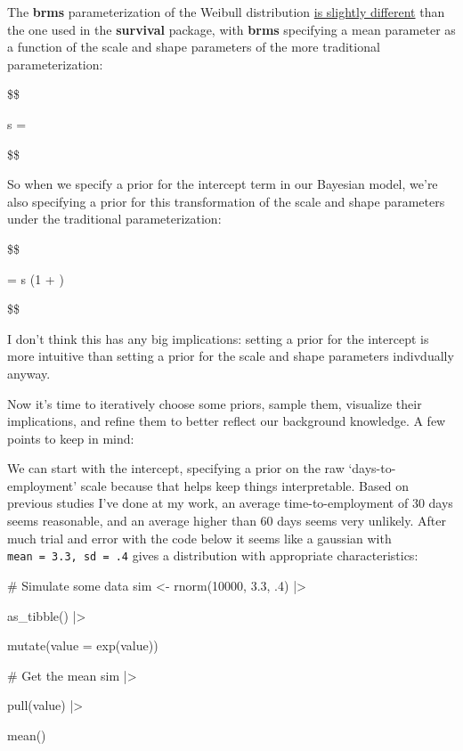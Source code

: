 \documentclass[
  letterpaper,
  DIV=11,
  numbers=noendperiod]{scrreprt}
\newenvironment{Shaded}{\begin{snugshade}}{\end{snugshade}}
\newcommand{\AttributeTok}[1]{\textcolor[rgb]{0.40,0.45,0.13}{#1}}
\newcommand{\CommentTok}[1]{\textcolor[rgb]{0.37,0.37,0.37}{#1}}
\newcommand{\DecValTok}[1]{\textcolor[rgb]{0.68,0.00,0.00}{#1}}
\newcommand{\FloatTok}[1]{\textcolor[rgb]{0.68,0.00,0.00}{#1}}
\newcommand{\FunctionTok}[1]{\textcolor[rgb]{0.28,0.35,0.67}{#1}}
\newcommand{\NormalTok}[1]{\textcolor[rgb]{0.00,0.23,0.31}{#1}}
\newcommand{\OtherTok}[1]{\textcolor[rgb]{0.00,0.23,0.31}{#1}}
\newcommand{\SpecialCharTok}[1]{\textcolor[rgb]{0.37,0.37,0.37}{#1}}
\begin{document}
The \textbf{brms} parameterization of the Weibull distribution
\href{https://cran.r-project.org/web/packages/brms/vignettes/brms_families.html}{is
slightly different} than the one used in the \textbf{survival} package,
with \textbf{brms} specifying a mean parameter as a function of the
scale and shape parameters of the more traditional parameterization:

\$\$

s = 

\$\$

So when we specify a prior for the intercept term in our Bayesian model,
we're also specifying a prior for this transformation of the scale and
shape parameters under the traditional parameterization:

\$\$

\mu = s \times \Gamma\left(1 + \right)

\$\$

I don't think this has any big implications: setting a prior for the
intercept is more intuitive than setting a prior for the scale and shape
parameters indivdually anyway.

Now it's time to iteratively choose some priors, sample them, visualize
their implications, and refine them to better reflect our background
knowledge. A few points to keep in mind:

We can start with the intercept, specifying a prior on the raw
`days-to-employment' scale because that helps keep things interpretable.
Based on previous studies I've done at my work, an average
time-to-employment of 30 days seems reasonable, and an average higher
than 60 days seems very unlikely. After much trial and error with the
code below it seems like a gaussian with
\texttt{mean\ =\ 3.3,\ sd\ =\ .4} gives a distribution with appropriate
characteristics:

\begin{Shaded}
\begin{Highlighting}[]
\CommentTok{\# Simulate some data}
\NormalTok{sim }\OtherTok{\textless{}{-}} \FunctionTok{rnorm}\NormalTok{(}\DecValTok{10000}\NormalTok{, }\FloatTok{3.3}\NormalTok{, .}\DecValTok{4}\NormalTok{) }\SpecialCharTok{|\textgreater{}}

  \FunctionTok{as\_tibble}\NormalTok{() }\SpecialCharTok{|\textgreater{}}

  \FunctionTok{mutate}\NormalTok{(}\AttributeTok{value =} \FunctionTok{exp}\NormalTok{(value)) }

\CommentTok{\# Get the mean}
\NormalTok{sim }\SpecialCharTok{|\textgreater{}} 

    \FunctionTok{pull}\NormalTok{(value) }\SpecialCharTok{|\textgreater{}}
    
    \FunctionTok{mean}\NormalTok{()}
\end{Highlighting}
\end{Shaded}
\end{document}
